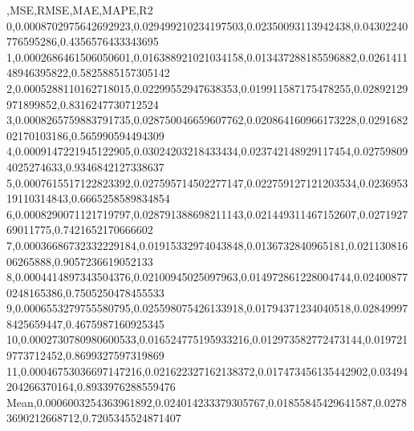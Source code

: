 ,MSE,RMSE,MAE,MAPE,R2
0,0.0008702975642692923,0.029499210234197503,0.02350093113942438,0.04302240776595286,0.4356576433343695
1,0.0002686461506050601,0.016388921021034158,0.013437288185596882,0.026141148946395822,0.5825885157305142
2,0.0005288110162718015,0.02299552947638353,0.019911587175478255,0.02892129971899852,0.8316247730712524
3,0.0008265759883791735,0.028750046659607762,0.020864160966173228,0.029168202170103186,0.565990594494309
4,0.0009147221945122905,0.03024203218433434,0.023742148929117454,0.027598094025274633,0.9346842127338637
5,0.0007615517122823392,0.027595714502277147,0.022759127121203534,0.023695319110314843,0.6665258589834854
6,0.0008290071121719797,0.028791388698211143,0.021449311467152607,0.027192769011775,0.7421652170666602
7,0.00036686732332229184,0.01915332974043848,0.0136732840965181,0.02113081606265888,0.9057236619052133
8,0.0004414897343504376,0.02100945025097963,0.014972861228004744,0.024008770248165386,0.7505250478455533
9,0.0006553279755580795,0.025598075426133918,0.01794371234040518,0.028499978425659447,0.4675987160925345
10,0.0002730780980600533,0.016524775195933216,0.012973582772473144,0.0197219773712452,0.8699327597319869
11,0.00046753036697147216,0.021622327162138372,0.017473456135442902,0.03494204266370164,0.8933976288559476
Mean,0.0006003254363961892,0.024014233379305767,0.01855845429641587,0.02783690212668712,0.7205345524871407
